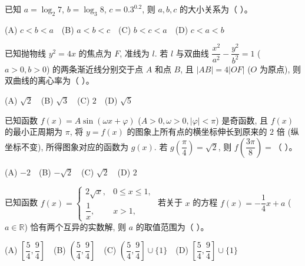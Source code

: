 \begin{question}
已知 $a = \log_2 7$, $b = \log_3 8$, $c = 0.3^{0.2}$, 则 $a, b, c$ 的大小关系为（ ）。

(A) $c < b < a$　(B) $a < b < c$　(C) $b < c < a$　(D) $c < a < b$

\end{question}
\begin{question}
已知抛物线 $y^2 = 4x$ 的焦点为 $F$, 准线为 $l$. 若 $l$ 与双曲线 $\dfrac{x^2}{a^2} - \dfrac{y^2}{b^2} = 1$ ($a > 0, b > 0$) 的两条渐近线分别交于点 $A$ 和点 $B$, 且 $|AB| = 4|OF|$ ($O$ 为原点), 则双曲线的离心率为（ ）。

(A) $\sqrt{2}$　(B) $\sqrt{3}$　(C) $2$　(D) $\sqrt{5}$

\end{question}
\begin{question}
已知函数 $f(x) = A \sin(\omega x + \varphi)$ ($A > 0, \omega > 0, |\varphi| < \pi$) 是奇函数, 且 $f(x)$ 的最小正周期为 $\pi$, 将 $y = f(x)$ 的图象上所有点的横坐标伸长到原来的 $2$ 倍 (纵坐标不变), 所得图象对应的函数为 $g(x)$. 若 $g\left(\dfrac{\pi}{4}\right) = \sqrt{2}$, 则 $f\left(\dfrac{3\pi}{8}\right) =$（ ）。

(A) $-2$　(B) $-\sqrt{2}$　(C) $\sqrt{2}$　(D) $2$

\end{question}
\begin{question}
已知函数 $f(x) = \begin{cases} 2\sqrt{x}, & 0 \leqslant x \leqslant 1, \\ \dfrac{1}{x}, & x > 1, \end{cases}$ 若关于 $x$ 的方程 $f(x) = -\dfrac{1}{4}x + a$ ($a \in \mathbb{R}$) 恰有两个互异的实数解, 则 $a$ 的取值范围为（ ）。

(A) $\left[\dfrac{5}{4}, \dfrac{9}{4}\right]$　(B) $\left(\dfrac{5}{4}, \dfrac{9}{4}\right]$　(C) $\left(\dfrac{5}{4}, \dfrac{9}{4}\right] \cup \{1\}$　(D) $\left[\dfrac{5}{4}, \dfrac{9}{4}\right] \cup \{1\}$

\par\medskip

\end{question}

